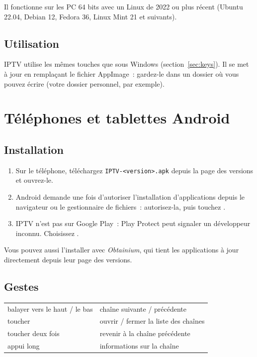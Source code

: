 Il fonctionne sur les PC 64 bits avec un Linux de 2022 ou plus récent
(Ubuntu 22.04, Debian 12, Fedora 36, Linux Mint 21 et suivants).


\subsection{Utilisation}
IPTV utilise les mêmes touches que sous Windows (section~\ref{sec:keys}). Il
se met à jour en remplaçant le fichier AppImage~: gardez-le dans un dossier
où vous pouvez écrire (votre dossier personnel, par exemple).

\section{Téléphones et tablettes Android}

\subsection{Installation}
\begin{enumerate}
  \item Sur le téléphone, téléchargez
        \texttt{IPTV-\textless version\textgreater.apk} depuis la page des
        versions et ouvrez-le.
  \item Android demande une fois d'autoriser l'installation d'applications
        depuis le navigateur ou le gestionnaire de fichiers~: autorisez-la,
        puis touchez .
  \item IPTV n'est pas sur Google Play~: Play Protect peut signaler un
        développeur inconnu. Choisissez .
\end{enumerate}
Vous pouvez aussi l'installer avec \emph{Obtainium}, qui tient les
applications à jour directement depuis leur page des versions.

\subsection{Gestes}
\begin{xltabular}{\linewidth}{@{}KX@{}}
balayer vers le haut / le bas & chaîne suivante / précédente \\
toucher & ouvrir / fermer la liste des chaînes \\
toucher deux fois & revenir à la chaîne précédente \\
appui long & informations sur la chaîne \\
\bottomrule
\end{xltabular}

